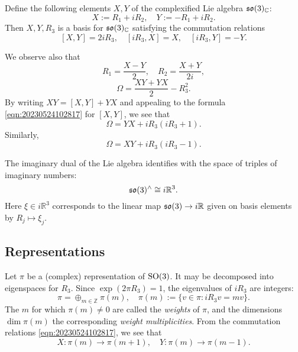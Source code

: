 \documentclass[reqno]{amsart} 
\numberwithin{equation}{section}
\begin{document}
Define the following elements $X,Y$ of the complexified Lie algebra $\operatorname{\mathfrak{s}\mathfrak{o}}(3)_{\mathbb{C}}$:
\begin{equation*}
  X := R_1 + i R_2,
  \quad
  Y := -R_1 + i R_2.
\end{equation*}
Then $X,Y,R_3$ is a basis for $\operatorname{\mathfrak{s}\mathfrak{o}}(3)_{\mathbb{C}}$ satisfying the commutation relations
\begin{equation}\label{eqn:20230524102817} [X,Y] = 2 i R_3,
  \quad
  [i R_3, X] = X,
  \quad
  [i R_3, Y] = - Y.
\end{equation}

We observe also that
\begin{equation*}
  R_1 = \frac{X - Y}{2},
  \quad
  R_2 = \frac{X + Y}{2 i},
\end{equation*}
\begin{equation*}
  \Omega =
  \frac{X Y + Y X}{2} - R_3^2.
\end{equation*}
By writing $X Y = [X,Y] + Y X$ and appealing to the formula \eqref{eqn:20230524102817} for $[X,Y]$, we see that
\begin{equation}\label{eqn:20230524102839}
  \Omega = Y X +  i R_3(i R_3 + 1).
\end{equation}
Similarly,
\begin{equation}\label{eqn:20230524104145}
  \Omega = X Y  + i R_3 (i R_3 - 1).
\end{equation}

The imaginary dual of the Lie algebra identifies with the space of triples of imaginary numbers:
\begin{equation}\label{eqn:d1a914f48fd7}
  \operatorname{\mathfrak{s}\mathfrak{o}}(3)^\wedge \cong  i \mathbb{R}^3.
\end{equation}
Here $\xi \in i \mathbb{R}^3$ corresponds to the linear map $\operatorname{\mathfrak{s}\mathfrak{o}}(3) \rightarrow i \mathbb{R}$ given on basis elements by $R_j \mapsto \xi_j$.

\subsection{Representations}\label{sec:d1a9162ec67d}
Let $\pi$ be a (complex) representation of $\operatorname{SO}(3)$.  It may be decomposed into eigenspaces for $R_3$.  Since $\exp(2 \pi R_3) = 1$, the eigenvalues of $i R_3$ are integers:
\begin{equation*}
  \pi = \oplus_{m \in \mathbb{Z}} \pi(m),
  \quad
  \pi(m) := \{ v \in \pi : i R_3 v = m v \}.
\end{equation*}
The $m$ for which $\pi(m) \neq 0$ are called the \emph{weights} of $\pi$, and the dimensions $\dim \pi(m)$ the corresponding \emph{weight multiplicities}.  From the commutation relations \eqref{eqn:20230524102817}, we see that
\begin{equation}\label{eqn:20230524104326}
  X : \pi(m) \rightarrow \pi(m+1),
  \quad
  Y : \pi(m) \rightarrow \pi(m-1).
\end{equation}
\end{document}
